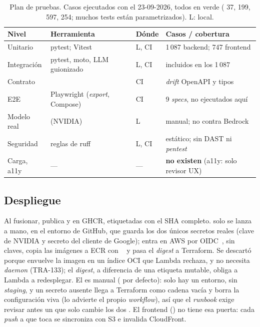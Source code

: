 \begin{table}[tb]
\centering\footnotesize
\caption{Plan de pruebas. Casos ejecutados con  el 23-09-2026, todos en verde
( 37,  199,  597,  254;
muchos tests están parametrizados). L: local.}
\label{tab:08-pruebas}
\begin{tabularx}{\columnwidth}{@{}l>{\raggedright\arraybackslash}p{2.15cm}lY@{}}
\toprule
Nivel & Herramienta & Dónde & Casos / cobertura \\
\midrule
Unitario & pytest; Vitest & L, CI & 1\,087 backend; 747 frontend \\
Integración & pytest, moto, LLM guionizado & L, CI & incluidos en los 1\,087 \\
Contrato &  & CI & \emph{drift} OpenAPI y tipos \\
E2E & Playwright (\emph{export}, Compose) & CI & 9 \emph{specs}, no ejecutados aquí \\
Modelo real &  (NVIDIA) & L & manual; no contra Bedrock \\
Seguridad & reglas  de ruff & L, CI & estático; sin DAST ni \emph{pentest} \\
Carga, a11y & --- & --- & \textbf{no existen} (a11y: solo revisor UX) \\
\bottomrule
\end{tabularx}
\end{table}

\subsection{Despliegue}
Al fusionar,  publica  y  en GHCR,
etiquetadas con el SHA completo.  solo se lanza a mano, en el entorno 
de GitHub, que guarda los dos únicos secretos reales (clave de NVIDIA y secreto del cliente de
Google); entra en AWS por OIDC~\cite{ci:gh-oidc}, sin claves, copia las imágenes a ECR con
~\cite{ci:crane} y pasa el \emph{digest} a Terraform. Se descartó
 porque envuelve la imagen en un índice OCI que Lambda
rechaza, y  no necesita \emph{daemon} (TRA-133); el \emph{digest}, a diferencia de una
etiqueta mutable, obliga a Lambda a redesplegar. El  es manual ( por
defecto): solo hay un entorno, sin \emph{staging}, y un secreto ausente llega a Terraform como
cadena vacía y borra la configuración viva (lo advierte el propio \emph{workflow}), así que el
\emph{runbook} exige revisar antes un  que solo cambie los dos . El
frontend () no tiene esa puerta: cada \emph{push} a  que toca
 se sincroniza con S3 e invalida CloudFront.

